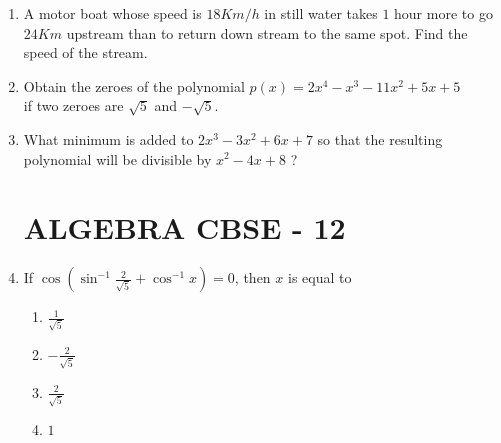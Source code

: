 \documentclass[12pt]{article}
\begin{document}
\begin{enumerate}
\item
	A motor boat whose speed is $18 Km/h$ in still water takes $1$ hour more to 
go $24 Km$ upstream than to return down stream to the same spot. Find the speed of the stream.

\item 
	Obtain the zeroes of the polynomial
$p(x) = 2x^4 - x^3 - 11x^2 + 5x + 5$ \\
if two zeroes are $\sqrt5$ and $-\sqrt5$.

\item
	What minimum is added to $2x^3 - 3x^2 + 6x + 7$ so that the resulting
polynomial will be divisible by $x^2 - 4x + 8$ ?

\section*{ALGEBRA CBSE - 12}
\item
	If $\cos\left(\sin^{-1}\frac{2}{\sqrt{5}} + \cos^{-1}x \right) = 0$, then $x$ is equal to
\begin{enumerate}
	\item $\frac{1}{\sqrt{5}}$
	\item $-\frac{2}{\sqrt{5}}$
	\item $\frac{2}{\sqrt{5}}$
        \item $1$
\end{enumerate}
\end{enumerate}
\end{document}
